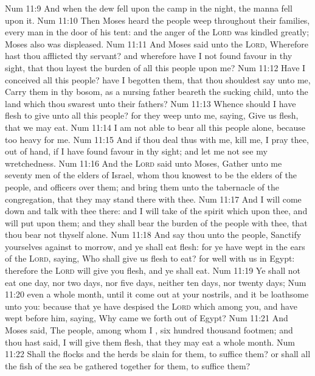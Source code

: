 \vs Num 11:9 And when the dew fell upon the camp in the night, the manna fell upon it.
\vs Num 11:10 Then Moses heard the people weep throughout their families, every man in the door of his tent: and the anger of the \textsc{Lord} was kindled greatly; Moses also was displeased.
\vs Num 11:11 And Moses said unto the \textsc{Lord}, Wherefore hast thou afflicted thy servant? and wherefore have I not found favour in thy sight, that thou layest the burden of all this people upon me?
\vs Num 11:12 Have I conceived all this people? have I begotten them, that thou shouldest say unto me, Carry them in thy bosom, as a nursing father beareth the sucking child, unto the land which thou swarest unto their fathers?
\vs Num 11:13 Whence should I have flesh to give unto all this people? for they weep unto me, saying, Give us flesh, that we may eat.
\vs Num 11:14 I am not able to bear all this people alone, because  too heavy for me.
\vs Num 11:15 And if thou deal thus with me, kill me, I pray thee, out of hand, if I have found favour in thy sight; and let me not see my wretchedness.
\vs Num 11:16 And the \textsc{Lord} said unto Moses, Gather unto me seventy men of the elders of Israel, whom thou knowest to be the elders of the people, and officers over them; and bring them unto the tabernacle of the congregation, that they may stand there with thee.
\vs Num 11:17 And I will come down and talk with thee there: and I will take of the spirit which  upon thee, and will put  upon them; and they shall bear the burden of the people with thee, that thou bear  not thyself alone.
\vs Num 11:18 And say thou unto the people, Sanctify yourselves against to morrow, and ye shall eat flesh: for ye have wept in the ears of the \textsc{Lord}, saying, Who shall give us flesh to eat? for  well with us in Egypt: therefore the \textsc{Lord} will give you flesh, and ye shall eat.
\vs Num 11:19 Ye shall not eat one day, nor two days, nor five days, neither ten days, nor twenty days;
\vs Num 11:20  even a whole month, until it come out at your nostrils, and it be loathsome unto you: because that ye have despised the \textsc{Lord} which  among you, and have wept before him, saying, Why came we forth out of Egypt?
\vs Num 11:21 And Moses said, The people, among whom I ,  six hundred thousand footmen; and thou hast said, I will give them flesh, that they may eat a whole month.
\vs Num 11:22 Shall the flocks and the herds be slain for them, to suffice them? or shall all the fish of the sea be gathered together for them, to suffice them?
